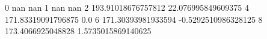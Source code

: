 0 nan nan
1 nan nan
2 193.91018676757812 22.076995849609375
4 171.83319091796875 0.0
6 171.30393981933594 -0.5292510986328125
8 173.4066925048828 1.5735015869140625
